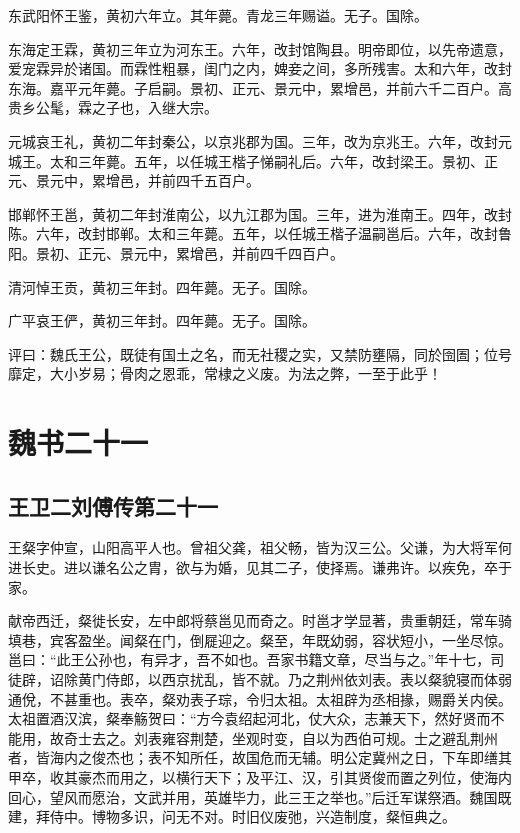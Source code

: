 \documentclass[12pt,UTF8]{ctexbook}
\begin{document}
东武阳怀王鉴，黄初六年立。其年薨。青龙三年赐谥。无子。国除。

东海定王霖，黄初三年立为河东王。六年，改封馆陶县。明帝即位，以先帝遗意，爱宠霖异於诸国。而霖性粗暴，闺门之内，婢妾之间，多所残害。太和六年，改封东海。嘉平元年薨。子启嗣。景初、正元、景元中，累增邑，并前六千二百户。高贵乡公髦，霖之子也，入继大宗。

元城哀王礼，黄初二年封秦公，以京兆郡为国。三年，改为京兆王。六年，改封元城王。太和三年薨。五年，以任城王楷子悌嗣礼后。六年，改封梁王。景初、正元、景元中，累增邑，并前四千五百户。

邯郸怀王邕，黄初二年封淮南公，以九江郡为国。三年，进为淮南王。四年，改封陈。六年，改封邯郸。太和三年薨。五年，以任城王楷子温嗣邕后。六年，改封鲁阳。景初、正元、景元中，累增邑，并前四千四百户。

清河悼王贡，黄初三年封。四年薨。无子。国除。

广平哀王俨，黄初三年封。四年薨。无子。国除。

评曰：魏氏王公，既徒有国土之名，而无社稷之实，又禁防壅隔，同於囹圄；位号靡定，大小岁易；骨肉之恩乖，常棣之义废。为法之弊，一至于此乎！

\part{魏书二十一}
\chapter{王卫二刘傅传第二十一}



王粲字仲宣，山阳高平人也。曾祖父龚，祖父畅，皆为汉三公。父谦，为大将军何进长史。进以谦名公之胄，欲与为婚，见其二子，使择焉。谦弗许。以疾免，卒于家。

献帝西迁，粲徙长安，左中郎将蔡邕见而奇之。时邕才学显著，贵重朝廷，常车骑填巷，宾客盈坐。闻粲在门，倒屣迎之。粲至，年既幼弱，容状短小，一坐尽惊。邕曰：“此王公孙也，有异才，吾不如也。吾家书籍文章，尽当与之。”年十七，司徒辟，诏除黄门侍郎，以西京扰乱，皆不就。乃之荆州依刘表。表以粲貌寝而体弱通侻，不甚重也。表卒，粲劝表子琮，令归太祖。太祖辟为丞相掾，赐爵关内侯。太祖置酒汉滨，粲奉觞贺曰：“方今袁绍起河北，仗大众，志兼天下，然好贤而不能用，故奇士去之。刘表雍容荆楚，坐观时变，自以为西伯可规。士之避乱荆州者，皆海内之俊杰也；表不知所任，故国危而无辅。明公定冀州之日，下车即缮其甲卒，收其豪杰而用之，以横行天下；及平江、汉，引其贤俊而置之列位，使海内回心，望风而愿治，文武并用，英雄毕力，此三王之举也。”后迁军谋祭酒。魏国既建，拜侍中。博物多识，问无不对。时旧仪废弛，兴造制度，粲恒典之。
\end{document}
